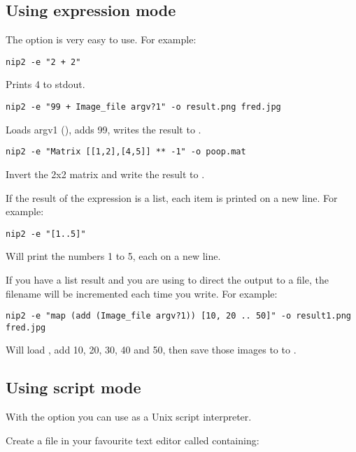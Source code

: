 \subsection{Using expression mode}

The  option is very easy to use. For example:

\begin{verbatim}
nip2 -e "2 + 2"
\end{verbatim}

\noindent
Prints 4 to stdout.

\begin{verbatim}
nip2 -e "99 + Image_file argv?1" -o result.png fred.jpg
\end{verbatim}

\noindent
Loads argv1 (), adds 99, writes the result to .

\begin{verbatim}
nip2 -e "Matrix [[1,2],[4,5]] ** -1" -o poop.mat
\end{verbatim}

\noindent
Invert the 2x2 matrix and write the result to .

If the result of the expression is a list, each item is printed on a new
line. For example:

\begin{verbatim}
nip2 -e "[1..5]"
\end{verbatim}

\noindent
Will print the numbers 1 to 5, each on a new line.

If you have a list result and you are using  to direct the output to a
file, the filename will be incremented each time you write. For example:

\begin{verbatim}
nip2 -e "map (add (Image_file argv?1)) [10, 20 .. 50]" -o result1.png fred.jpg
\end{verbatim}

\noindent
Will load , add 10, 20, 30, 40 and 50, then save those images to
 to .

\subsection{Using script mode}

With the  option you can use \nip{} as a Unix script interpreter.

Create a file in your favourite text editor called  containing:

